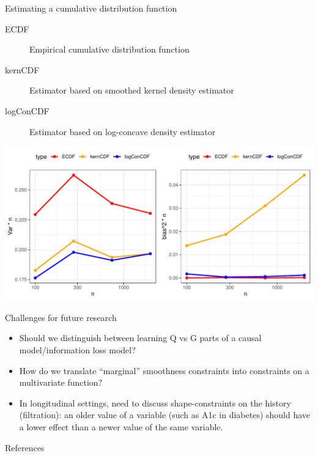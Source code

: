 \documentclass[smaller]{beamer}\usepackage{listings}
\begin{document}
\begin{frame}[label={sec:org7860b98}]{Estimating a cumulative distribution function}
\small

\begin{description}
\item[{\color{red}ECDF}] Empirical cumulative distribution function
\item[{\color{orange}kernCDF}] Estimator based on smoothed kernel density estimator
\item[{\color{blue}logConCDF}] Estimator based on log-concave density estimator
\citep{dumbgen2009maximum,Rufibach_Duembgen_2023}
\end{description}

\includegraphics[width=1\textwidth]{./cdf-estimators.pdf}
\end{frame}


\begin{frame}[label={sec:orgcb27f95}]{Challenges for future research}
\begin{itemize}
\item Should we distinguish between learning Q vs G parts of a causal
model/information loss model?

\item How do we translate ``marginal'' smoothness constraints into 
constraints on a multivariate function?

\item In longitudinal settings, need to discuss shape-constraints on the
history (filtration): an older value of a variable (such as A1c in
diabetes) should have a lower effect than a newer value of the same
variable.
\end{itemize}
\end{frame}

\begin{frame}[label={sec:orgdd92619}]{References}
\footnotesize 
\end{frame}
\end{document}
